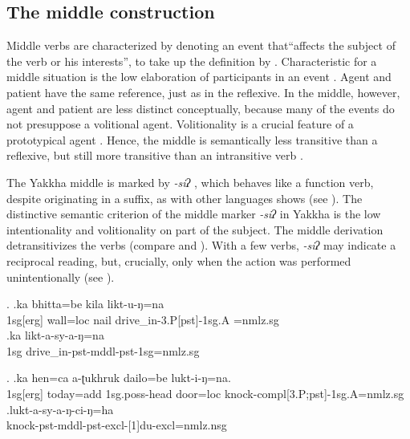 \subsection{The middle construction}\label{middle}

Middle verbs are characterized by denoting an event that“affects the subject of the verb or his interests”, to take up the definition by \citet[373]{Lyons1969_Introduction}. Characteristic for a middle situation is the low elaboration of participants in an event \citep[3]{Kemmer1993_Middle}. Agent and patient have the same reference, just as in the reflexive. In the middle, however, agent and patient are less distinct conceptually, because many of the events do not presuppose a volitional agent. Volitionality is a crucial feature of a prototypical agent \citep{Hopperetal1980Transitivity, Foleyetal1984Functional}. Hence, the middle is semantically less transitive than a reflexive, but still more transitive than an intransitive verb  \citep[73]{Kemmer1993_Middle}. 

The Yakkha middle is marked by \emph{-siʔ} , which behaves like a function verb, despite originating in a suffix, as  with other  languages shows (see ). The distinctive semantic criterion of the middle marker \emph{-siʔ} in Yakkha is the low intentionality and volitionality  on part of  the subject. The middle derivation detransitivizes the verbs (compare \Next[a] and \Next[b]). With a few verbs, \emph{-siʔ} may indicate a reciprocal reading, but, crucially, only when the action was performed unintentionally (see \NNext).

\ex. \ag.ka bhitta=be kila likt-u-ŋ=na\\
		{\sc 1sg[erg]} wall{\sc =loc} nail 	drive\_in-{\sc 3.P[pst]-1sg.A =nmlz.sg}	\\
 	\bg.ka  likt-a-sy-a-ŋ=na\\
		{\sc 1sg}  drive\_in{\sc -pst-mddl-pst-1sg=nmlz.sg} 		\\


\ex. \ag.ka hen=ca a-ʈukhruk dailo=be lukt-i-ŋ=na.\\
		{\sc 1sg[erg]} today{\sc =add} {\sc 1sg.poss}-head door{\sc =loc} knock{\sc -compl[3.P;pst]-1sg.A=nmlz.sg} \\
 	\bg.lukt-a-sy-a-ŋ-ci-ŋ=ha\\
	knock-{\sc pst-mddl-pst-excl-[1]du-excl=nmlz.nsg}	\\


